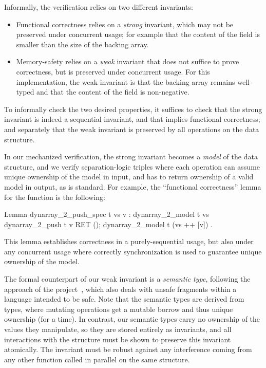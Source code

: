 Informally, the verification relies on two different invariants:
\begin{itemize}
\item Functional correctness relies on a \emph{strong} invariant,
  which may not be preserved under concurrent usage; for example that
  the content of the  field is smaller than the
  size of the backing array.
\item Memory-safety relies on a \emph{weak} invariant that does not
  suffice to prove correctness, but is preserved under concurrent
  usage. For this  implementation, the weak
  invariant is that the backing array remains well-typed and that the
  content of the  field is non-negative.
\end{itemize}
To informally check the two desired properties, it suffices to check
that the strong invariant is indeed a sequential invariant, and that
implies functional correctness; and separately that the weak invariant
is preserved by all operations on the data structure.

In our mechanized verification, the strong invariant becomes a \emph{model}
of the data structure, and we verify separation-logic triples where
each operation can assume unique ownership of the model in input, and
has to return ownership of a valid model in output, as is
standard. For example, the ``functional correctness'' lemma for the
 function is the following:

\begin{coqcode}
Lemma dynarray_2_push_spec t vs v :
  {{{ dynarray_2_model t vs }}}
    dynarray_2_push t v
  {{{ RET (); dynarray_2_model t (vs ++ [v]) }}}.
\end{coqcode}

This lemma establishes correctness in a purely-sequential usage, but
also under any concurrent usage where correctly synchronization is used to
guarantee unique ownership of the model.

The formal counterpart of our weak invariant is a \emph{semantic type}, following the approach of the \RustBelt project~\citep*{rustbelt}, which also deals with unsafe fragments within a language intended to be safe. Note that the \RustBelt semantic types are derived from \Rust types, where mutating operations get a mutable borrow and thus unique ownership (for a time). In contrast, our semantic types carry no ownership of the values they manipulate, so they are stored entirely as invariants, and all interactions with the structure must be shown to preserve this invariant atomically. The invariant must be robust against any interference coming from any other function called in parallel on the same structure.

